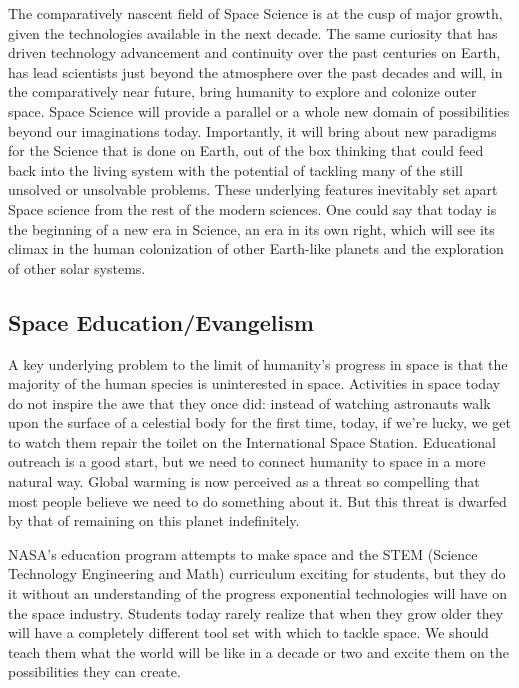 \documentclass[letter,11pt]{article}
\begin{document}
The comparatively nascent field of Space Science is at the cusp of major
growth, given the technologies available in the next decade. The same curiosity
that has driven technology advancement and continuity over the past centuries
on Earth, has lead scientists just beyond the atmosphere over the past decades
and will, in the comparatively near future, bring humanity to explore and
colonize outer space. Space Science will provide a parallel or a whole new
domain of possibilities beyond our imaginations today. Importantly, it will
bring about new paradigms for the Science that is done on Earth, out of the box
thinking that could feed back into the living system with the potential of
tackling many of the still unsolved or unsolvable problems. These underlying
features inevitably set apart Space science from the rest of the modern
sciences. One could say that today is the beginning of a new era in Science, an
era in its own right, which will see its climax in the human colonization of
other Earth-like planets and the exploration of other solar systems. 

\subsection{Space Education/Evangelism}

A key underlying problem to the limit  of humanity's progress in space is that the majority of the human  species is uninterested in space. Activities in space today do not  inspire the awe that they once did: instead of watching astronauts walk  upon the surface of a celestial body for the first time, today, if we're  lucky, we get to watch them repair the toilet on the International  Space Station. Educational outreach is a good start, but we need to  connect humanity to space in a more natural way. Global warming is now  perceived as a threat so compelling that most people believe we need to  do something about it. But this threat is dwarfed by that of remaining  on this planet indefinitely.

NASA's  education program attempts to make space and the STEM (Science  Technology Engineering and Math) curriculum exciting for students, but  they do it without an understanding of the progress exponential  technologies will have on the space industry. Students today rarely  realize that when they grow older they will have a completely different  tool set with which to tackle space. We should teach them what the world  will be like in a decade or two and excite them on the possibilities  they can create.
\end{document}
